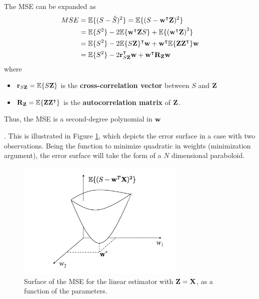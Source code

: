 {The MSE can be expanded as
\begin{align}
\label{Est:LMSEw}
MSE &= \mathbb{E}\{(S - \hat S)^2\} = \mathbb{E}\{(S - {\bf w}^\intercal {\bf Z})^2\}  \nonumber\\
    &= \mathbb{E}\{S^2\} - 2 \mathbb{E}\{{\bf w}^\intercal{\bf Z}S\} 
      + \mathbb{E}\{\left({\bf w}^\intercal {\bf Z}\right)^2\}   \nonumber\\
    &= \mathbb{E}\{S^2\} - 2 \mathbb{E}\{S {\bf Z}\}^\intercal {\bf w} 
      + {\bf w}^\intercal \mathbb{E}\{{\bf Z}{\bf Z}^\intercal\}{\bf w} \nonumber\\
    &= \mathbb{E}\{S^2\} - 2 {\bf r}_{S{\bf Z}}^\intercal {\bf w} 
      + {\bf w}^\intercal {\bf R}_{\bf Z} {\bf w}
\end{align}
where
\begin{itemize}
\item ${\bf r}_{S{\bf Z}} = \mathbb{E}\{S {\bf Z}\}$ is the \textbf{cross-correlation vector} between $S$ and ${\bf Z}$
\item ${\bf R}_{\bf Z}=\mathbb{E}\{{\bf Z}{\bf Z}^\intercal\}$ is the \textbf{autocorrelation matrix} of ${\bf Z}$.
\end{itemize}
Thus, the MSE is a second-degree polynomial in ${\bf w}$}. This is illustrated in Figure \ref{fig:linear_est_error_surface}, which depicts the error surface in a case with two observations. Being the function to minimize quadratic in weights (minimization argument), the error surface will take the form of a $N$ dimensional paraboloid. 
\begin{figure}[htb]
  \begin{center}
  \includegraphics[width=8cm]{Figures//linear_est_error_surface.png}
    \caption{Surface of the MSE for the linear estimator with ${\bf Z}={\bf X}$, as a function of the parameters.}
    \label{fig:linear_est_error_surface}
  \end{center}
\end{figure}

